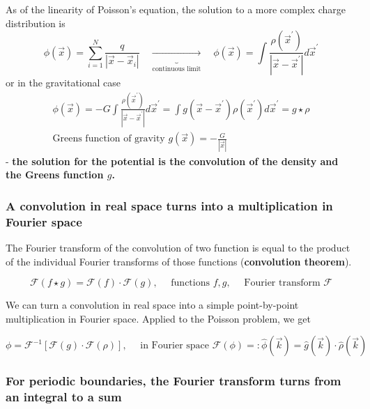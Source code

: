 As of the linearity of Poisson's equation, the solution to a more complex charge distribution is
\begin{equation}
    \phi(\vec{x})=\sum_{i=1}^N \frac{q}{\left|\vec{x}-\vec{x}_i\right|} \quad \underbrace{\rightarrow}_{\text{continuous limit}} \quad \phi(\vec{x})=\int \frac{\rho\left(\vec{x}^{\prime}\right)}{\left|\vec{x}-\vec{x}^{\prime}\right|} d \vec{x}^{\prime}
\end{equation}
or in the gravitational case
\begin{equation}
    \begin{gathered}
        \phi(\vec{x})=-G \int \frac{\rho\left(\vec{x}^{\prime}\right)}{\left|\vec{x}-\vec{x}^{\prime}\right|} d \vec{x}^{\prime}=\int g\left(\vec{x}-\vec{x}^{\prime}\right) \rho\left(\vec{x}^{\prime}\right) d \vec{x}^{\prime}=g \star \rho \\
        \text{Greens function of gravity } g(\vec{x}) = -\frac{G}{|\vec{x}|}
    \end{gathered}
\end{equation}
- \textbf{the solution for the potential is the convolution of the density and the Greens function $g$.}

\subsubsection{A convolution in real space turns into a multiplication in Fourier space}
The Fourier transform of the convolution of two function is equal to the product
of the individual Fourier transforms of those functions (\textbf{convolution theorem}).

\begin{equation}
    \mathcal{F}(f \star g)=\mathcal{F}(f) \cdot \mathcal{F}(g), \quad \text { functions } f, g, \quad \text { Fourier transform } \mathcal{F}
\end{equation}

We can turn a convolution in real space into a simple point-by-point multiplication in Fourier space. Applied
to the Poisson problem, we get

\begin{equation}
    \phi=\mathcal{F}^{-1}[\mathcal{F}(g) \cdot \mathcal{F}(\rho)], \quad \text { in Fourier space } \mathcal{F}(\phi)=: \hat{\phi}(\vec{k})=\hat{g}(\vec{k}) \cdot \hat{\rho}(\vec{k})
\end{equation}

\subsubsection{For periodic boundaries, the Fourier transform turns from an integral to a sum}

